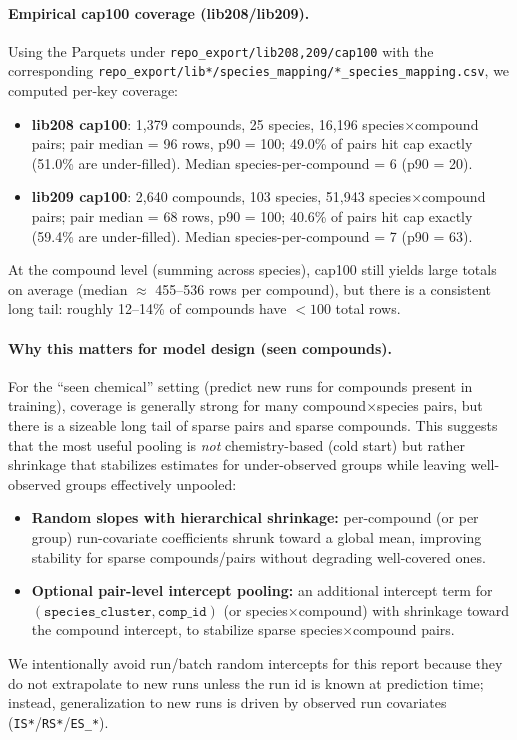 \documentclass[11pt]{article}
\begin{document}
\paragraph{Empirical cap100 coverage (lib208/lib209).}
Using the Parquets under \texttt{repo\_export/lib{208,209}/cap100} with the corresponding
\texttt{repo\_export/lib*/species\_mapping/*\_species\_mapping.csv}, we computed per-key coverage:
\begin{itemize}
  \item \textbf{lib208 cap100}: 1,379 compounds, 25 species, 16,196 species$\times$compound pairs; pair median = 96 rows, p90 = 100;
        49.0\% of pairs hit cap exactly (51.0\% are under-filled). Median species-per-compound = 6 (p90 = 20).
  \item \textbf{lib209 cap100}: 2,640 compounds, 103 species, 51,943 species$\times$compound pairs; pair median = 68 rows, p90 = 100;
        40.6\% of pairs hit cap exactly (59.4\% are under-filled). Median species-per-compound = 7 (p90 = 63).
\end{itemize}
At the compound level (summing across species), cap100 still yields large totals on average (median $\approx$ 455--536 rows per
compound), but there is a consistent long tail: roughly 12--14\% of compounds have $<100$ total rows.

\paragraph{Why this matters for model design (seen compounds).}
For the ``seen chemical'' setting (predict new runs for compounds present in training), coverage is generally strong for many
compound$\times$species pairs, but there is a sizeable long tail of sparse pairs and sparse compounds.
This suggests that the most useful pooling is \emph{not} chemistry-based (cold start) but rather shrinkage that stabilizes estimates
for under-observed groups while leaving well-observed groups effectively unpooled:
\begin{itemize}
  \item \textbf{Random slopes with hierarchical shrinkage:} per-compound (or per group) run-covariate coefficients shrunk toward a
        global mean, improving stability for sparse compounds/pairs without degrading well-covered ones.
  \item \textbf{Optional pair-level intercept pooling:} an additional intercept term for $(\texttt{species\_cluster},\texttt{comp\_id})$
        (or species$\times$compound) with shrinkage toward the compound intercept, to stabilize sparse species$\times$compound pairs.
\end{itemize}
We intentionally avoid run/batch random intercepts for this report because they do not extrapolate to new runs unless the run id is
known at prediction time; instead, generalization to new runs is driven by observed run covariates (\texttt{IS*}/\texttt{RS*}/\texttt{ES\_*}).
\end{document}
